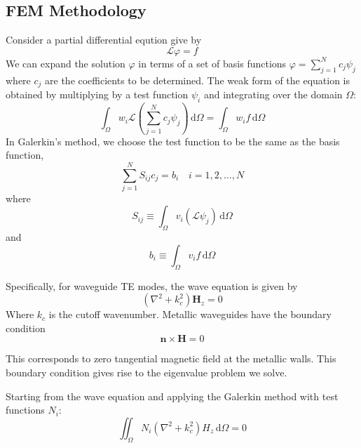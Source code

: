 \documentclass[10pt,letterpaper]{article}
\begin{document}
\subsection*{FEM Methodology}
Consider a partial differential eqution give by 
\begin{equation}
\mathcal{L} \varphi = f
\end{equation}
We can expand the solution $\varphi$ in terms of a set of basis functions $\varphi = \sum_{j=1}^{N} c_j \psi_j$
where $c_j$ are the coefficients to be determined. The weak form of the equation 
is obtained by multiplying by a test function $\psi_i$ and integrating over the 
domain $\Omega${\cite{jin2015theory}}: 
\begin{equation}
\int_{\Omega} w_i \mathcal{L} \left( \sum_{j=1}^{N} c_j \psi_j \right) \, \mathrm{d}\Omega = \int_{\Omega} w_i f \, \mathrm{d}\Omega
\end{equation}
In Galerkin's method, we choose the test function to be the same as the basis function,
\begin{equation}
\sum_{j=1}^{N} S_{ij} c_j = b_i \quad i = 1, 2, \ldots, N 
\end{equation}
where 
\begin{equation}
S_{ij} \equiv \int_{\Omega} v_i \left( \mathcal{L} \psi_j \right) \, \mathrm{d}\Omega 
\end{equation}
and 
\begin{equation}
b_i \equiv \int_{\Omega} v_i f \, \mathrm{d}\Omega 
\end{equation}

Specifically, for waveguide TE modes, the wave equation is given by
\begin{equation}
\left( \nabla^2 + k_c^2 \right) \mathbf{H}_z = 0
\end{equation}
Where $k_c$ is the cutoff wavenumber. Metallic waveguides have the boundary condition
\begin{equation}
\mathbf{n} \times \mathbf{H} = 0
\end{equation}

This corresponds to zero tangential magnetic field at the metallic walls. This boundary condition gives rise to the eigenvalue problem we solve.

Starting from the wave equation and applying the Galerkin method with test functions $N_i$:
\begin{equation}
\iint_\Omega N_i(\nabla^2 + k_c^2)H_z \, \mathrm{d}\Omega = 0
\end{equation}
\end{document}
